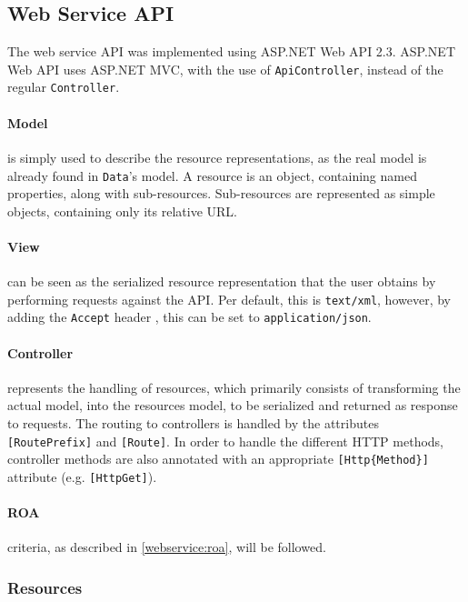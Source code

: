 \subsection{Web Service API}\label{design:web_service}
The web service API was implemented using ASP.NET Web API 2.3.\cite{aspnet_webapi}
ASP.NET Web API uses ASP.NET MVC\cite{aspnet_mvc}, with the use of \texttt{ApiController}, instead of the regular \texttt{Controller}.

\paragraph{Model} is simply used to describe the resource representations, as the real model is already found in \texttt{Data}'s model.
A resource is an object, containing named properties, along with sub-resources.
Sub-resources are represented as simple objects, containing only its relative URL.

\paragraph{View} can be seen as the serialized resource representation that the user obtains by performing requests against the API.
Per default, this is \texttt{text/xml}, however, by adding the \texttt{Accept} header , this can be set to \texttt{application/json}.

\paragraph{Controller} represents the handling of resources, which primarily consists of transforming the actual model, into the resources model, to be serialized and returned as response to requests.
The routing to controllers is handled by the attributes \texttt{[RoutePrefix]} and \texttt{[Route]}.
In order to handle the different HTTP methods, controller methods are also annotated with an appropriate \texttt{[Http\{Method\}]} attribute (e.g. \texttt{[HttpGet]}).

\paragraph{ROA} criteria, as described in \cref{webservice:roa}, will be followed.

\subsubsection{Resources}
\newcommand{\resource}[5]{\begin{description}
\item[URL:]{\texttt{#1}}
\item[Properties:]{\texttt{#2}}
\item[Resources:]{\texttt{#3}}
\item[Methods:]{\texttt{#4}}
\item[Responses:]{\texttt{#5}}
\end{description}}

